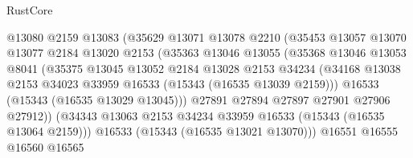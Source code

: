 \begin{lexlean}{RustCore}
\begin{coremodule}
                                @13080
                                @2159
                                @13083
                                (@35629
                                  @13071
                                  @13078
                                  @2210
                                  (@35453
                                    @13057
                                    @13070
                                    @13077
                                    @2184
                                    @13020
                                    @2153
                                    (@35363
                                      @13046
                                      @13055
                                      (@35368
                                        @13046
                                        @13053
                                        @8041
                                        (@35375
                                          @13045
                                          @13052
                                          @2184
                                          @13028
                                          @2153
                                          @34234
                                          (@34168
                                            @13038
                                            @2153
                                            @34023
                                            @33959
                                            @16533
                                            (@15343 (@16535 @13039 @2159)))
                                          @16533
                                          (@15343 (@16535 @13029 @13045)))
                                        @27891
                                        @27894
                                        @27897
                                        @27901
                                        @27906
                                        @27912))
                                    (@34343
                                      @13063
                                      @2153
                                      @34234
                                      @33959
                                      @16533
                                      (@15343 (@16535 @13064 @2159)))
                                    @16533
                                    (@15343 (@16535 @13021 @13070)))
                                  @16551
                                  @16555
                                  @16560
                                  @16565

\end{coremodule}
\end{lexlean}
